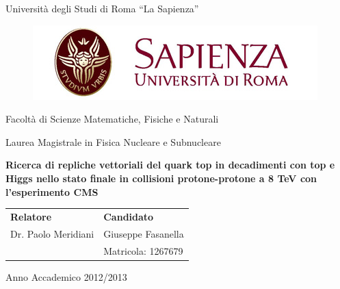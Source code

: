 \begin{titlepage}
 \begin{center}
  
\huge{Università degli Studi di Roma ``La Sapienza''}

\vspace{4mm}
\begin{figure}[!h]
\begin{center}
\includegraphics[scale=0.5]{figures/logostampa.jpg}
\end{center}
\end{figure}

\vspace{8mm}
\LARGE{Facoltà di Scienze Matematiche, Fisiche e Naturali}

\vspace{4mm}
\Large{Laurea Magistrale in Fisica Nucleare e Subnucleare}


\vspace{10mm}
\Large\textbf{{Ricerca di repliche vettoriali del quark top in decadimenti con top e
Higgs nello stato finale in collisioni protone-protone a 8 TeV con
l'esperimento CMS}}
 \end{center}

\vspace{55mm}
\begin{tabularx}{\columnwidth}{XX}
 \large{\textbf{Relatore}} &\raggedleft \arraybackslash \large{\textbf{Candidato}} \\
\large{Dr. Paolo Meridiani} &\raggedleft \arraybackslash \large{Giuseppe Fasanella} \\
\ &\raggedleft \arraybackslash \large{Matricola: 1267679} \\
\end{tabularx} 

\bigskip

\bigskip

\bigskip

\vspace{10mm}
\begin{center}
 Anno Accademico 2012/2013
\end{center}


\end{titlepage} 



